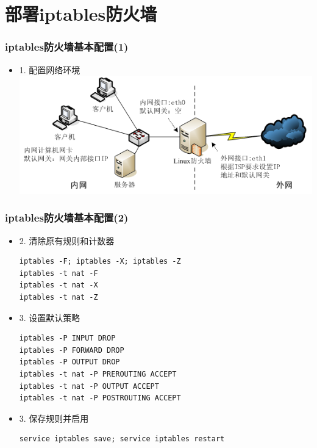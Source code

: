 \documentclass[xcolor=svgnames,presentation]{beamer}
\begin{document}
\section{部署iptables防火墙}
\label{sec-3}
\begin{frame}
\frametitle{iptables防火墙基本配置(1)}
\label{sec-3-1}
\begin{itemize}

\item 1. 配置网络环境\\
\label{sec-3-1-1}%
\includegraphics[width=.9\linewidth]{img/iptables7.png}
\end{itemize} %
\end{frame}
\begin{frame}[fragile]
\frametitle{iptables防火墙基本配置(2)}
\label{sec-3-2}
\begin{itemize}

\item 2. 清除原有规则和计数器\\
\label{sec-3-2-1}%
\begin{verbatim}
iptables -F; iptables -X; iptables -Z
iptables -t nat -F
iptables -t nat -X
iptables -t nat -Z
\end{verbatim}

\item 3. 设置默认策略\\
\label{sec-3-2-2}%
\begin{verbatim}
iptables -P INPUT DROP
iptables -P FORWARD DROP
iptables -P OUTPUT DROP
iptables -t nat -P PREROUTING ACCEPT
iptables -t nat -P OUTPUT ACCEPT
iptables -t nat -P POSTROUTING ACCEPT
\end{verbatim}

\item 3. 保存规则并启用\\
\label{sec-3-2-3}%
\begin{verbatim}
service iptables save; service iptables restart
\end{verbatim}
\end{itemize} %
\end{frame}
\end{document}
